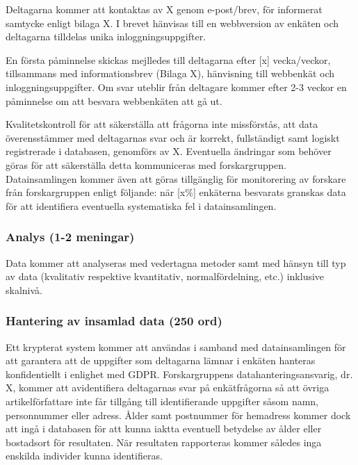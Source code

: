 \documentclass[]{tufte-handout}
\begin{document}
Deltagarna kommer att kontaktas av X genom e-post/brev, för informerat
samtycke enligt bilaga X. I brevet hänvisas till en webbversion av
enkäten och deltagarna tilldelas unika inloggningsuppgifter.

En första påminnelse skickas mejlledes till deltagarna efter {[}x{]}
vecka/veckor, tillsammans med informationsbrev (Bilaga X), hänvisning
till webbenkät och inloggningsuppgifter. Om svar uteblir från deltagare
kommer efter 2-3 veckor en påminnelse om att besvara webbenkäten att gå
ut.

Kvalitetskontroll för att säkerställa att frågorna inte missförstås, att
data överensstämmer med deltagarnas svar och är korrekt, fullständigt
samt logiskt registrerade i databasen, genomförs av X. Eventuella
ändringar som behöver göras för att säkerställa detta kommuniceras med
forskargruppen. Datainsamlingen kommer även att göras tillgänglig för
monitorering av forskare från forskargruppen enligt följande: när
{[}x\%{]} enkäterna besvarats granskas data för att identifiera
eventuella systematiska fel i datainsamlingen.

\hypertarget{analys-1-2-meningar}{%
\subsubsection{Analys (1-2 meningar)}\label{analys-1-2-meningar}}

Data kommer att analyseras med vedertagna metoder samt med hänsyn till
typ av data (kvalitativ respektive kvantitativ, normalfördelning, etc.)
inklusive skalnivå.

\hypertarget{hantering-av-insamlad-data-250-ord}{%
\subsubsection{Hantering av insamlad data (250
ord)}\label{hantering-av-insamlad-data-250-ord}}

Ett krypterat system kommer att användas i samband med datainsamlingen
för att garantera att de uppgifter som deltagarna lämnar i enkäten
hanteras konfidentiellt i enlighet med GDPR. Forskargruppens
datahanteringsansvarig, dr. X, kommer att avidentifiera deltagarnas svar
på enkätfrågorna så att övriga artikelförfattare inte får tillgång till
identifierande uppgifter såsom namn, personnummer eller adress. Ålder
samt postnummer för hemadress kommer dock att ingå i databasen för att
kunna iaktta eventuell betydelse av ålder eller bostadsort för
resultaten. När resultaten rapporteras kommer således inga enskilda
individer kunna identifieras.
\end{document}
